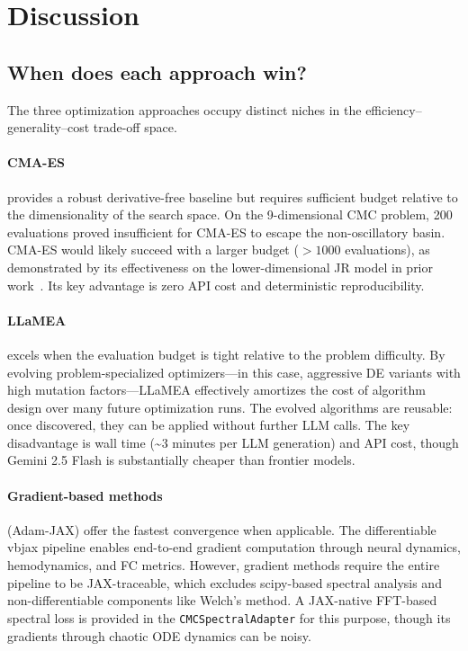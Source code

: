 \documentclass[11pt,a4paper]{article}
\begin{document}
\section{Discussion}

\subsection{When does each approach win?}

The three optimization approaches occupy distinct niches in the efficiency--generality--cost trade-off space.

\paragraph{CMA-ES} provides a robust derivative-free baseline but requires sufficient budget relative to the dimensionality of the search space.
On the 9-dimensional CMC problem, 200 evaluations proved insufficient for CMA-ES to escape the non-oscillatory basin.
CMA-ES would likely succeed with a larger budget ($> 1000$ evaluations), as demonstrated by its effectiveness on the lower-dimensional JR model in prior work~\citep{Griffiths2024}.
Its key advantage is zero API cost and deterministic reproducibility.

\paragraph{LLaMEA} excels when the evaluation budget is tight relative to the problem difficulty.
By evolving problem-specialized optimizers—in this case, aggressive DE variants with high mutation factors—LLaMEA effectively amortizes the cost of algorithm design over many future optimization runs.
The evolved algorithms are reusable: once discovered, they can be applied without further LLM calls.
The key disadvantage is wall time (\textasciitilde 3 minutes per LLM generation) and API cost, though Gemini 2.5 Flash is substantially cheaper than frontier models.

\paragraph{Gradient-based methods} (Adam-JAX) offer the fastest convergence when applicable.
The differentiable vbjax pipeline enables end-to-end gradient computation through neural dynamics, hemodynamics, and FC metrics.
However, gradient methods require the entire pipeline to be JAX-traceable, which excludes scipy-based spectral analysis and non-differentiable components like Welch's method.
A JAX-native FFT-based spectral loss is provided in the \texttt{CMCSpectralAdapter} for this purpose, though its gradients through chaotic ODE dynamics can be noisy.
\end{document}
